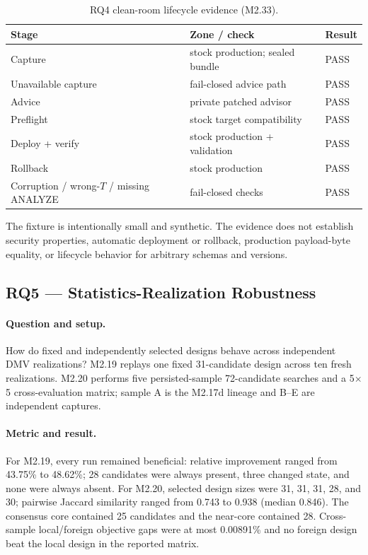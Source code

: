 \begin{table}[t]
\caption{RQ4 clean-room lifecycle evidence (M2.33).}
\label{tab:rq4}
\scriptsize
\begin{tabular}{@{}p{}p{}p{}@{}}
\toprule
Stage & Zone / check & Result \\
\midrule
Capture & stock production; sealed bundle & PASS \\
Unavailable capture & fail-closed advice path & PASS \\
Advice & private patched advisor & PASS \\
Preflight & stock target compatibility & PASS \\
Deploy + verify & stock production + validation & PASS \\
Rollback & stock production & PASS \\
Corruption / wrong-$T$ / missing ANALYZE & fail-closed checks & PASS \\
\bottomrule
\end{tabular}
\end{table}

The fixture is intentionally small and synthetic.  The evidence does not
establish security properties, automatic deployment or rollback, production
payload-byte equality, or lifecycle behavior for arbitrary schemas and
versions.

\subsection{RQ5 --- Statistics-Realization Robustness}

\paragraph{Question and setup.}
How do fixed and independently selected designs behave across independent DMV
realizations?  M2.19 replays one fixed 31-candidate design across ten fresh
realizations.  M2.20 performs five persisted-sample 72-candidate searches and
a 5$\times$5 cross-evaluation matrix; sample A is the M2.17d lineage and B--E
are independent captures.

\paragraph{Metric and result.}
For M2.19, every run remained beneficial: relative improvement ranged from
43.75\% to 48.62\%; 28 candidates were always present, three changed state,
and none were always absent.  For M2.20, selected design sizes were 31, 31,
31, 28, and 30; pairwise Jaccard similarity ranged from 0.743 to 0.938
(median 0.846).  The consensus core contained 25 candidates and the near-core
contained 28.  Cross-sample local/foreign objective gaps were at most 0.00891\%
and no foreign design beat the local design in the reported matrix.

